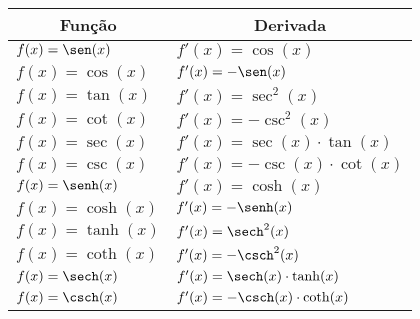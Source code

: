 \begin{frame}{}
    \begin{table}[H]
    \renewcommand{\arraystretch}{1.5}
    \footnotesize
    \begin{tabular}{ll}
    \multicolumn{1}{c}{\textbf{Função}}            & \multicolumn{1}{c}{\textbf{Derivada}}                                         \\ \hline
    \multicolumn{1}{|l|}{$f(x)=\sen(x)$}           & \multicolumn{1}{l|}{$f'(x)=\cos(x)$}                                          \\ \hline
    \multicolumn{1}{|l|}{$f(x)=\cos(x)$}           & \multicolumn{1}{l|}{$f'(x)=-\sen(x)$}                                         \\ \hline
    \multicolumn{1}{|l|}{$f(x)=\tan(x)$}           & \multicolumn{1}{l|}{$f'(x)=\sec^2(x)$}                                        \\ \hline
    \multicolumn{1}{|l|}{$f(x)=\cot(x)$}           & \multicolumn{1}{l|}{$f'(x)=-\csc^2(x)$}                                       \\ \hline
    \multicolumn{1}{|l|}{$f(x)=\sec(x)$}           & \multicolumn{1}{l|}{$f'(x)=\sec(x)\cdot\tan(x)$}                              \\ \hline
    \multicolumn{1}{|l|}{$f(x)=\csc(x)$}           & \multicolumn{1}{l|}{$f'(x)=-\csc(x)\cdot \cot(x)$}                            \\ \hline
    \multicolumn{1}{|l|}{$f(x)=\senh(x)$}           & \multicolumn{1}{l|}{$f'(x)=\cosh(x)$}                                          \\ \hline
    \multicolumn{1}{|l|}{$f(x)=\cosh(x)$}           & \multicolumn{1}{l|}{$f'(x)=-\senh(x)$}                                         \\ \hline
    \multicolumn{1}{|l|}{$f(x)=\tanh(x)$}           & \multicolumn{1}{l|}{$f'(x)=\sech^2(x)$}                                        \\ \hline
    \multicolumn{1}{|l|}{$f(x)=\coth(x)$}           & \multicolumn{1}{l|}{$f'(x)=-\csch^2(x)$}                                       \\ \hline
    \multicolumn{1}{|l|}{$f(x)=\sech(x)$}           & \multicolumn{1}{l|}{$f'(x)=\sech(x)\cdot\tanh(x)$}                              \\ \hline
    \multicolumn{1}{|l|}{$f(x)=\csch(x)$}           & \multicolumn{1}{l|}{$f'(x)=-\csch(x)\cdot \coth(x)$}                            \\ \hline
    \end{tabular}
\end{table}
\end{frame}
